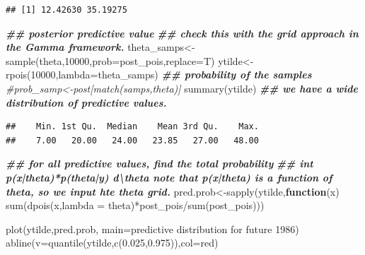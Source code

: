 \documentclass[
]{book}
\newenvironment{Shaded}{\begin{snugshade}}{\end{snugshade}}
\newcommand{\AttributeTok}[1]{\textcolor[rgb]{0.77,0.63,0.00}{#1}}
\newcommand{\CommentTok}[1]{\textcolor[rgb]{0.56,0.35,0.01}{\textit{#1}}}
\newcommand{\ControlFlowTok}[1]{\textcolor[rgb]{0.13,0.29,0.53}{\textbf{#1}}}
\newcommand{\DecValTok}[1]{\textcolor[rgb]{0.00,0.00,0.81}{#1}}
\newcommand{\DocumentationTok}[1]{\textcolor[rgb]{0.56,0.35,0.01}{\textbf{\textit{#1}}}}
\newcommand{\FloatTok}[1]{\textcolor[rgb]{0.00,0.00,0.81}{#1}}
\newcommand{\FunctionTok}[1]{\textcolor[rgb]{0.00,0.00,0.00}{#1}}
\newcommand{\NormalTok}[1]{#1}
\newcommand{\OtherTok}[1]{\textcolor[rgb]{0.56,0.35,0.01}{#1}}
\newcommand{\SpecialCharTok}[1]{\textcolor[rgb]{0.00,0.00,0.00}{#1}}
\newcommand{\StringTok}[1]{\textcolor[rgb]{0.31,0.60,0.02}{#1}}
\theoremstyle{definition}
\theoremstyle{definition}
\theoremstyle{definition}
\theoremstyle{definition}
\theoremstyle{remark}
\begin{document}
\begin{verbatim}
## [1] 12.42630 35.19275
\end{verbatim}

\begin{Shaded}
\begin{Highlighting}[]
\DocumentationTok{\#\# posterior predictive value}
   \DocumentationTok{\#\# check this with the grid approach in the Gamma framework.  }
\NormalTok{  theta\_samps}\OtherTok{\textless{}{-}}\FunctionTok{sample}\NormalTok{(theta,}\DecValTok{10000}\NormalTok{,}\AttributeTok{prob=}\NormalTok{post\_pois,}\AttributeTok{replace=}\NormalTok{T)}
\NormalTok{   ytilde}\OtherTok{\textless{}{-}}\FunctionTok{rpois}\NormalTok{(}\DecValTok{10000}\NormalTok{,}\AttributeTok{lambda=}\NormalTok{theta\_samps) }
 \DocumentationTok{\#\# probability of the samples }
 \CommentTok{\#prob\_samp\textless{}{-}post[match(samps,theta)]}
  \FunctionTok{summary}\NormalTok{(ytilde) }\DocumentationTok{\#\# we have a wide distribution of predictive values.}
\end{Highlighting}
\end{Shaded}

\begin{verbatim}
##    Min. 1st Qu.  Median    Mean 3rd Qu.    Max. 
##    7.00   20.00   24.00   23.85   27.00   48.00
\end{verbatim}

\begin{Shaded}
\begin{Highlighting}[]
\DocumentationTok{\#\# for all predictive values,  find the total probability  }
   \DocumentationTok{\#\# int p(x|theta)*p(theta|y) d\textbackslash{}theta  note that p(x|theta) is a function of theta, so we input hte theta grid.}
\NormalTok{ pred.prob}\OtherTok{\textless{}{-}}\FunctionTok{sapply}\NormalTok{(ytilde,}\ControlFlowTok{function}\NormalTok{(x) }\FunctionTok{sum}\NormalTok{(}\FunctionTok{dpois}\NormalTok{(x,}\AttributeTok{lambda =}\NormalTok{ theta)}\SpecialCharTok{*}\NormalTok{post\_pois}\SpecialCharTok{/}\FunctionTok{sum}\NormalTok{(post\_pois)))  }
  
 \FunctionTok{plot}\NormalTok{(ytilde,pred.prob, }\AttributeTok{main=}\StringTok{\textquotesingle{}predictive distribution for future 1986\textquotesingle{}}\NormalTok{)}
 \FunctionTok{abline}\NormalTok{(}\AttributeTok{v=}\FunctionTok{quantile}\NormalTok{(ytilde,}\FunctionTok{c}\NormalTok{(}\FloatTok{0.025}\NormalTok{,}\FloatTok{0.975}\NormalTok{)),}\AttributeTok{col=}\StringTok{\textquotesingle{}red\textquotesingle{}}\NormalTok{)}
\end{Highlighting}
\end{Shaded}
\end{document}
